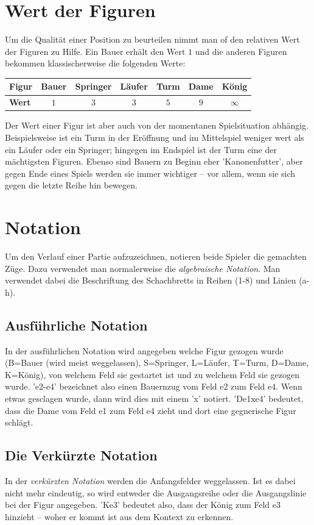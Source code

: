 \documentclass{article}
\begin{document}
\section{Wert der Figuren}
Um die Qualität einer Position zu beurteilen  nimmt man of den relativen Wert der Figuren zu Hilfe. Ein Bauer erhält den Wert $1$ und die anderen Figuren bekommen klassischerweise die folgenden Werte:
\begin{center}
\begin{tabular}{|l|c|c|c|c|c|c|}
\hline
{\bf Figur} &Bauer&Springer&Läufer& Turm& Dame& König \\
\hline
{\bf Wert} &$1$& $3$&$3$&$5$&$9$&$\infty$ \\
\hline
\end{tabular}
\end{center}
Der Wert einer Figur ist aber auch von der momentanen Spielsituation abhängig. Beispielsweise ist ein Turm in der Eröffnung und im Mittelspiel weniger wert als ein Läufer oder ein Springer; hingegen im Endspiel ist der Turm eine der mächtigsten Figuren. Ebenso sind Bauern zu Beginn eher 'Kanonenfutter', aber gegen Ende eines Spiels werden sie immer wichtiger -- vor allem, wenn sie sich gegen die letzte Reihe hin bewegen.

\newpage
\section{Notation}
Um den Verlauf  einer Partie aufzuzeichnen, notieren beide Spieler die gemachten Züge. Dazu verwendet man normalerweise die \emph{algebraische Notation}. Man verwendet dabei die Beschriftung des Schachbretts in Reihen (1-8) und Linien (a-h). 
\subsection{Ausführliche Notation }
In der ausführlichen Notation wird angegeben welche Figur gezogen wurde (B=Bauer (wird meist weggelassen), S=Springer, L=Läufer, T=Turm, D=Dame, K=König), von welchem Feld sie gestartet ist und zu welchem Feld sie gezogen wurde. 'e2-e4' bezeichnet also einen Bauernzug vom Feld e2 zum Feld e4. Wenn etwas gesclagen wurde, dann wird dies mit einem 'x' notiert. 'De1xe4' bedeutet, dass die Dame vom Feld e1 zum Feld e4 zieht und dort eine gegnerische Figur schlägt.

\subsection{Die Verkürzte Notation}
In der  \emph{verkürzten Notation} werden die Anfangsfelder weggelassen.  Ist es dabei nicht mehr eindeutig, so wird entweder die Ausgangsreihe oder die Ausgangslinie bei der Figur angegeben. 'Ke3' bedeutet also, dass der König zum Feld e3 hinzieht -- woher er kommt ist aus dem Kontext zu erkennen.
\end{document}
